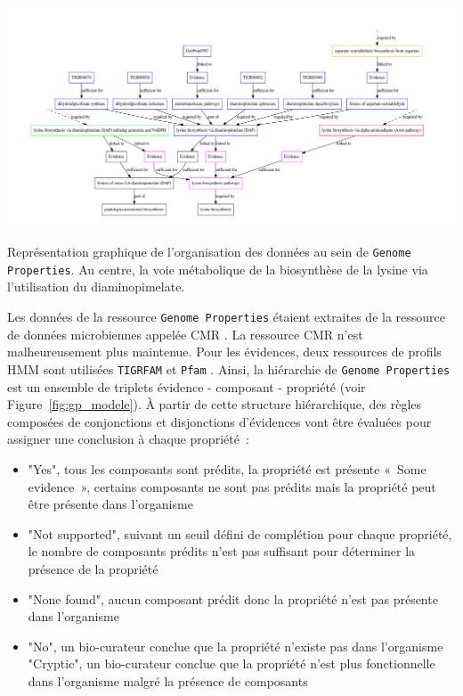 \begin{refsegment}
    \begin{shadedfigure}[H]
        \centering
        \includegraphics[width=\textwidth]{img/lysine_biosynthesis.pdf}
        \caption{ Représentation graphique de l'organisation des données au sein de \texttt{Genome Properties}. Au centre, la voie métabolique de la biosynthèse de la lysine via l'utilisation du diaminopimelate. }
        \label{fig:gp_lysine}
    \end{shadedfigure}

    Les données de  la ressource \texttt{Genome Properties} étaient extraites de la ressource de données microbiennes appelée \gls{CMR} \cite{peterson2001comprehensive,davidsen2009comprehensive}. La ressource \gls{CMR} n’est malheureusement plus maintenue. Pour les évidences, deux ressources de profils \gls{HMM} sont utilisées \texttt{TIGRFAM} \cite{haft2003tigrfams}\label{key} et \texttt{Pfam} \cite{bateman2000pfam,bateman2002pfam,bateman2004pfam,finn2008pfam,finn2009pfam,punta2011pfam,finn2013pfam,finn2016pfam}. Ainsi, la hiérarchie de \texttt{Genome Properties} est un ensemble de triplets évidence - composant - propriété (voir Figure~\cref{fig:gp_modele}). À partir de cette structure hiérarchique, des règles composées de conjonctions et disjonctions d’évidences vont être évaluées pour assigner une conclusion à chaque propriété :
    \begin{itemize}
        \item "Yes", tous les composants sont prédits, la propriété est présente
        « Some evidence », certains composants ne sont pas prédits mais la propriété peut être présente dans l’organisme
        \item "Not supported", suivant un seuil défini de complétion pour chaque propriété, le nombre de composants prédits n’est pas suffisant pour déterminer la présence de la propriété
        \item "None found", aucun composant prédit donc la propriété n’est pas présente dans l’organisme
        \item "No", un bio-curateur conclue que la propriété n’existe pas dans l’organisme
        "Cryptic", un bio-curateur conclue que la propriété n’est plus fonctionnelle dans l’organisme malgré la présence de composants
    \end{itemize}
    

\end{refsegment}
